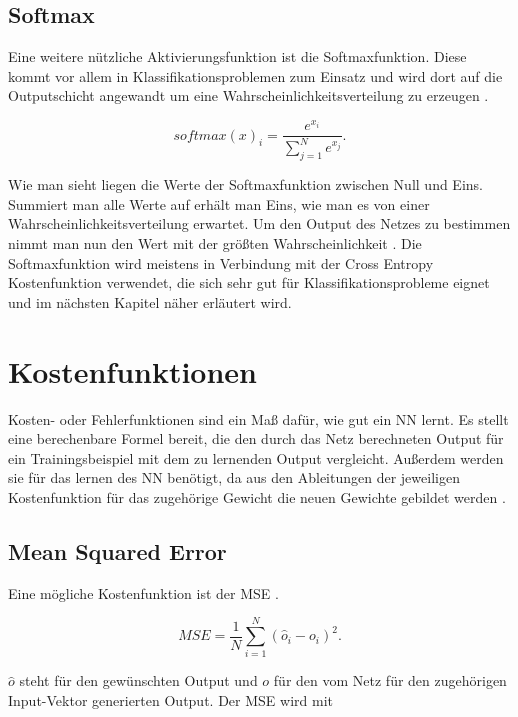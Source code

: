 \subsection{Softmax}\label{softmax}
Eine weitere nützliche Aktivierungsfunktion ist die Softmaxfunktion. Diese kommt vor allem in Klassifikationsproblemen zum Einsatz und wird dort auf die Outputschicht angewandt um eine Wahrscheinlichkeitsverteilung zu erzeugen \cite{Goodfellow}.

\begin{equation}
softmax(x)_i=\frac{e^{x_i}}{\sum_{j=1}^{N}e^{x_j}}.
\end{equation}


Wie man sieht liegen die Werte der Softmaxfunktion zwischen Null und Eins. Summiert man alle Werte auf erhält man Eins, wie man es von einer Wahrscheinlichkeitsverteilung erwartet. Um den Output des Netzes zu bestimmen nimmt man nun den Wert mit der größten Wahrscheinlichkeit \cite{handson}. Die Softmaxfunktion wird meistens in Verbindung mit der Cross Entropy Kostenfunktion verwendet, die sich sehr gut für Klassifikationsprobleme eignet und im nächsten Kapitel näher erläutert wird.



\section{Kostenfunktionen}
Kosten- oder Fehlerfunktionen sind ein Maß daf\"ur, wie gut ein \gls{NN} lernt. Es stellt eine berechenbare Formel bereit, die den durch das Netz berechneten Output f\"ur ein Trainingsbeispiel mit dem zu lernenden Output vergleicht. Au\ss erdem werden sie f\"ur das lernen des \gls{NN} ben\"otigt, da aus den Ableitungen der jeweiligen Kostenfunktion f\"ur das zugeh\"orige Gewicht die neuen Gewichte gebildet werden \cite{Goodfellow}.




\subsection{Mean Squared Error}
Eine m\"ogliche Kostenfunktion ist der \gls{MSE} \cite{Rojas1996}.

\begin{equation}
MSE=\frac{1}{N}\sum_{i=1}^{N} (\hat{o}_i-o_i)^2.
\end{equation}

$\hat{o}$ steht f\"ur den gew\"unschten Output und $o$ f\"ur den vom Netz f\"ur den zugeh\"origen Input-Vektor generierten Output.
Der \gls{MSE} wird mit \cite{cookbook}

